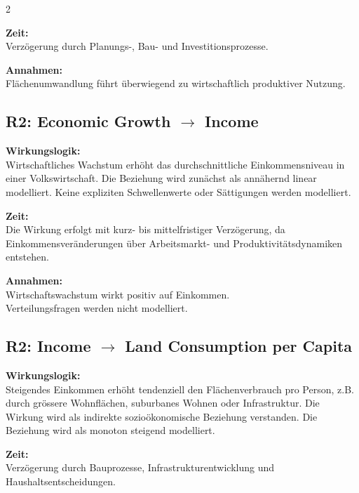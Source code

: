 \documentclass[10pt, a4paper]{article}
\begin{document}
\begin{multicols}{2}
\begin{minipage}{\linewidth}
\textbf{Zeit:}\\
Verzögerung durch Planungs-, Bau- und Investitionsprozesse.

\textbf{Annahmen:}\\
Flächenumwandlung führt überwiegend zu wirtschaftlich produktiver Nutzung.
\end{minipage}\vspace{1em}

\begin{minipage}{\linewidth}
\subsection*{R2: Economic Growth $\rightarrow$ Income}

\textbf{Wirkungslogik:}\\
Wirtschaftliches Wachstum erhöht das durchschnittliche Einkommensniveau in einer Volkswirtschaft. 
Die Beziehung wird zunächst als annähernd linear modelliert. Keine expliziten Schwellenwerte oder Sättigungen werden modelliert.

\textbf{Zeit:}\\
Die Wirkung erfolgt mit kurz- bis mittelfristiger Verzögerung, da Einkommensveränderungen über Arbeitsmarkt- und Produktivitätsdynamiken entstehen.

\textbf{Annahmen:}\\
Wirtschaftswachstum wirkt positiv auf Einkommen.\\
Verteilungsfragen werden nicht modelliert.
\end{minipage}\vspace{1em}

\begin{minipage}{\linewidth}
\subsection*{R2: Income $\rightarrow$ Land Consumption per Capita}

\textbf{Wirkungslogik:}\\
Steigendes Einkommen erhöht tendenziell den Flächenverbrauch pro Person, z.B. durch grössere Wohnflächen, suburbanes Wohnen oder Infrastruktur.
Die Wirkung wird als indirekte sozioökonomische Beziehung verstanden.
Die Beziehung wird als monoton steigend modelliert.

\textbf{Zeit:}\\
Verzögerung durch Bauprozesse, Infrastrukturentwicklung und Haushaltsentscheidungen.


\end{minipage}
\end{multicols}
\end{document}
